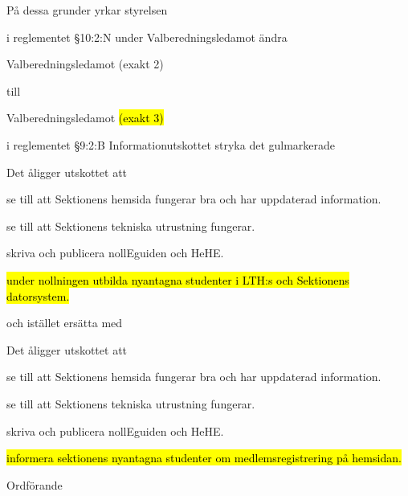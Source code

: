 \documentclass[../_main/handlingar.tex]{subfiles}
\begin{document}
På dessa grunder yrkar styrelsen
\begin{attsatser}
    
    \att i reglementet \S10:2:N  under Valberedningsledamot ändra
        \begin{emptylist}
            \item Valberedningsledamot (exakt 2)
         \end{emptylist}
    
        till 
    
        \begin{emptylist}
            \item Valberedningsledamot \hl{(exakt 3)}
        \end{emptylist}
        \changenote

    \att i reglementet \S9:2:B Informationutskottet stryka det gulmarkerade 
        \begin{emptylist}
            \item Det åligger utskottet att
            \begin{dashlist}
                \item se till att Sektionens hemsida fungerar bra och har uppdaterad information.
                \item se till att Sektionens tekniska utrustning fungerar.
                \item skriva och publicera nollEguiden och HeHE.
                \item \hl{under nollningen utbilda nyantagna studenter i LTH:s och Sektionens datorsystem.}
            \end{dashlist}
        \end{emptylist}
    
        och istället ersätta med
    
        \begin{emptylist}
            \item Det åligger utskottet att
            \begin{dashlist}
                \item se till att Sektionens hemsida fungerar bra och har uppdaterad information.
                \item se till att Sektionens tekniska utrustning fungerar.
                \item skriva och publicera nollEguiden och HeHE.
                \item \hl{informera sektionens nyantagna studenter om medlemsregistrering på hemsidan.}
            \end{dashlist}
        \end{emptylist}
        \changenote
    
    

\end{attsatser}







\begin{signatures}{1}
    \ist
    \signature{\ordf}{Ordförande}

\end{signatures}
\end{document}
